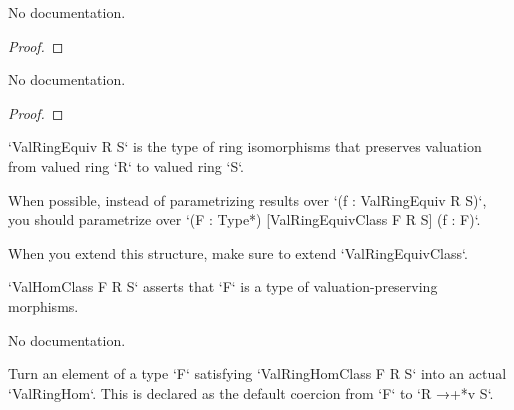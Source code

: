 \begin{theorem}\label{ValAlgEquiv.liftInteger_refl}
        \leanok
                No documentation.
    \end{theorem}

\begin{proof}
    \leanok
\end{proof}

\begin{theorem}\label{ValAlgEquiv.eq_refl_of_liftInteger_eq_refl}
        \leanok
                No documentation.
    \end{theorem}

\begin{proof}
    \leanok
\end{proof}

\begin{definition}\label{ValRingEquiv}
        \leanok
                `ValRingEquiv R S` is the type of ring isomorphisms that preserves valuation from valued ring `R` to valued ring `S`.

When possible, instead of parametrizing results over `(f : ValRingEquiv R S)`,
you should parametrize over `(F : Type*) [ValRingEquivClass F R S] (f : F)`.

When you extend this structure, make sure to extend `ValRingEquivClass`.
    \end{definition}

\begin{definition}\label{ValRingHomClass}
        \leanok
                `ValHomClass F R S` asserts that `F` is a type of valuation-preserving morphisms.
    \end{definition}

\begin{definition}\label{ValRingEquivClass}
        \leanok
                No documentation.
    \end{definition}

\begin{definition}\label{ValRingHomClass.toValRingHom}
        \leanok
                Turn an element of a type `F` satisfying `ValRingHomClass F R S` into an actual
`ValRingHom`. This is declared as the default coercion from `F` to `R →+*v S`.
    \end{definition}

